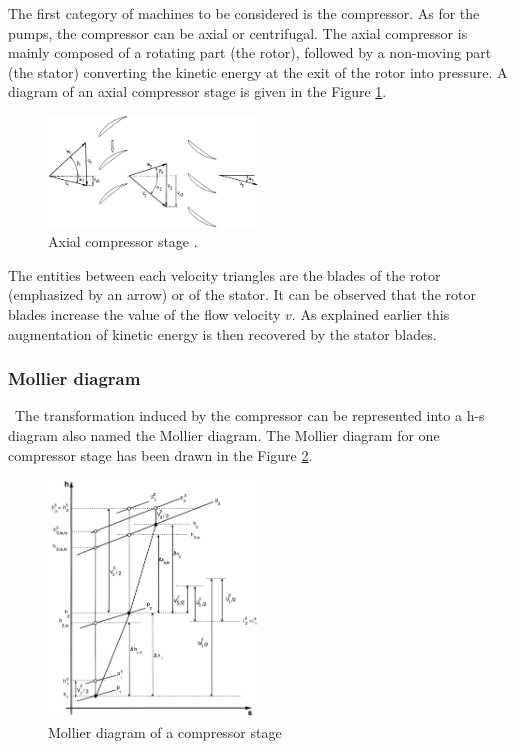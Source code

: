 The first category of machines to be considered is the compressor. As for the pumps, the compressor can be axial or centrifugal.  The axial compressor is mainly composed of a rotating part (the rotor), followed by a non-moving part (the stator) converting the kinetic energy at the exit of the rotor into pressure. A diagram of an axial compressor stage is given in the Figure \ref{fig:C4_compstage}.

\begin{figure}[h]
    \centering
    \includegraphics[width=0.5\textwidth]{Comp_stage.png}
    \caption{Axial compressor stage \cite{Hillewaert2019}.}
    \label{fig:C4_compstage}
\end{figure}

The entities between each velocity triangles are the blades of the rotor (emphasized by an arrow) or of the stator. It can be observed that the rotor blades increase the value of the flow velocity \(v\). As explained earlier this augmentation of kinetic energy is then recovered by the stator blades.

\subsubsection{Mollier diagram}
\quad\ The transformation induced by the compressor can be represented into a h-s diagram also named the Mollier diagram. The Mollier diagram for one compressor stage has been drawn in the Figure \ref{fig:C4_Molliercomp}.

\begin{figure}[h]
    \centering
    \includegraphics[width=0.5\textwidth]{Comp_mollier.png}
    \caption{Mollier diagram of a compressor stage \cite{Hillewaert2019}}
    \label{fig:C4_Molliercomp}
\end{figure}

